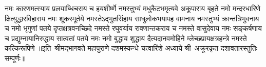 
\twolineshloka
{नमः कारणमत्स्याय प्रलयाब्धिचराय च}
{हयशीर्ष्णे नमस्तुभ्यं मधुकैटभमृत्यवे}%
\twolineshloka
{अकूपाराय बृहते नमो मन्दरधारिणे}
{क्षित्युद्धारविहाराय नमः शूकरमूर्तये}%
\twolineshloka
{नमस्तेऽद्भुतसिंहाय साधुलोकभयापह}
{वामनाय नमस्तुभ्यं क्रान्तत्रिभुवनाय च}%
\twolineshloka
{नमो भृगुणां पतये दृप्तक्षत्रवनच्छिदे}
{नमस्ते रघुवर्याय रावणान्तकराय च}%
\twolineshloka
{नमस्ते वासुदेवाय नमः सङ्कर्षणाय च}
{प्रद्युम्नायानिरुद्धाय सात्वतां पतये नमः}%
\twolineshloka
{नमो बुद्धाय शुद्धाय दैत्यदानवमोहिने}
{म्लेच्छप्रायक्षत्रहन्त्रे नमस्ते कल्किरूपिणे}%
॥इति~श्रीमद्भागवते महापुराणे दशमस्कन्धे चत्वारिंशे अध्याये श्री~अक्रूरकृत दशावतारस्तुतिः सम्पूर्णः॥ 
%
%
%
%
